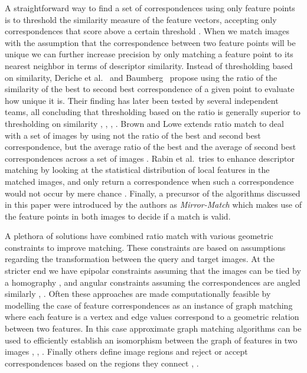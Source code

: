 \documentclass[journal]{IEEEtran}
\begin{document}
A straightforward way to find a set of correspondences using only 
feature points is to threshold the similarity measure of the feature 
vectors, accepting only correspondences that score above a certain 
threshold \cite{szeliski2010}. When we match images with the assumption 
that the correspondence between two feature points will be unique we can 
further increase precision by only matching a feature point to its 
nearest neighbor in terms of descriptor similarity. Instead of 
thresholding based on similarity, Deriche et 
al.~\cite{deriche1994robust} and Baumberg~\cite{baumberg2000reliable} 
propose using the ratio of the similarity of the best to second best 
correspondence of a given point to evaluate how unique it is. Their 
finding has later been tested by several independent teams, all 
concluding that thresholding based on the ratio is generally superior to 
thresholding on similarity \cite{lowe2004sift}, 
\cite{mikolajczyk2005performance}, \cite{moreels2007evaluation}, 
\cite{rabin2009statistical}. Brown and Lowe extends ratio match to deal 
with a set of images by using not the ratio of the best and second best 
correspondence, but the average ratio of the best and the average of 
second best correspondences across a set of images 
\cite{brown2005multi}.  Rabin et al.\ tries to enhance descriptor 
matching by looking at the statistical distribution of local features in 
the matched images, and only return a correspondence when such a 
correspondence would not occur by mere chance 
\cite{rabin2009statistical}. Finally, a precursor of the algorithms 
discussed in this paper were introduced by the authors as 
\emph{Mirror-Match} \cite{arnfred2013mirror} which makes use of the 
feature points in both images to decide if a match is valid.

A plethora of solutions have combined ratio match with various geometric 
constraints to improve matching. These constraints are based on 
assumptions regarding the transformation between the query and target 
images. At the stricter end we have epipolar constraints assuming
that the images can be tied by a homography \cite{torr2000mlesac}, 
\cite{chum2005matching} and angular constraints assuming the 
correspondences are angled similarly \cite{kim2008efficient}, 
\cite{schmid1997local}. Often these approaches are made computationally 
feasible by modelling the case of feature correspondences as an instance 
of graph matching where each feature is a vertex and edge values 
correspond to a geometric relation between two features. In this case 
approximate graph matching algorithms can be used to efficiently 
establish an isomorphism between the graph of features in two images 
\cite{leordeanu2005spectral}, \cite{torresani2008feature}, 
\cite{yarkony2010covering}. Finally others define image regions and 
reject or accept correspondences based on the regions they connect 
\cite{cho2009feature}, \cite{wu2011robust}.
\end{document}
